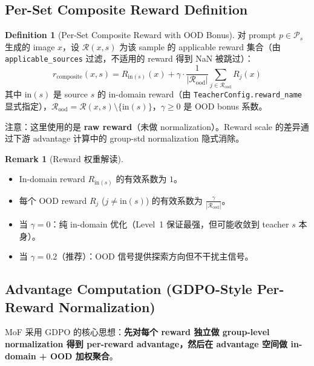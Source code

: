 \documentclass[11pt,a4paper]{article}
\theoremstyle{definition}
\newtheorem{definition}{Definition}
\newtheorem{remark}{Remark}
\begin{document}
\subsection{Per-Set Composite Reward Definition}

\begin{definition}[Per-Set Composite Reward with OOD Bonus]
\label{def:per_set_reward}
对 prompt $p \in \mathcal{P}_s$ 生成的 image $x$，设 $\mathcal{R}(x, s)$ 为该 sample 的 applicable reward 集合（由 \texttt{applicable\_sources} 过滤，不适用的 reward 得到 NaN 被跳过）：
\begin{equation}
\boxed{
r_{\mathrm{composite}}(x, s) = R_{\mathrm{in}(s)}(x) + \gamma \cdot \frac{1}{|\mathcal{R}_{\mathrm{ood}}|}\sum_{j \in \mathcal{R}_{\mathrm{ood}}} R_j(x)
}
\label{eq:reward_def}
\end{equation}
其中 $\mathrm{in}(s)$ 是 source $s$ 的 in-domain reward（由 \texttt{TeacherConfig.reward\_name} 显式指定），$\mathcal{R}_{\mathrm{ood}} = \mathcal{R}(x,s) \setminus \{\mathrm{in}(s)\}$，$\gamma \geq 0$ 是 OOD bonus 系数。

注意：这里使用的是 \textbf{raw reward}（未做 normalization）。Reward scale 的差异通过下游 advantage 计算中的 group-std normalization 隐式消除。
\end{definition}

\begin{remark}[Reward 权重解读]
\begin{itemize}[leftmargin=1.5em]
\item In-domain reward $R_{\mathrm{in}(s)}$ 的有效系数为 $1$。
\item 每个 OOD reward $R_j$ ($j \neq \mathrm{in}(s)$) 的有效系数为 $\frac{\gamma}{|\mathcal{R}_{\mathrm{ood}}|}$。
\item 当 $\gamma = 0$：纯 in-domain 优化（Level~1 保证最强，但可能收敛到 teacher $s$ 本身）。
\item 当 $\gamma = 0.2$（推荐）：OOD 信号提供探索方向但不干扰主信号。
\end{itemize}
\end{remark}

\subsection{Advantage Computation (GDPO-Style Per-Reward Normalization)}

MoF 采用 GDPO 的核心思想：\textbf{先对每个 reward 独立做 group-level normalization 得到 per-reward advantage，然后在 advantage 空间做 in-domain + OOD 加权聚合}。
\end{document}
